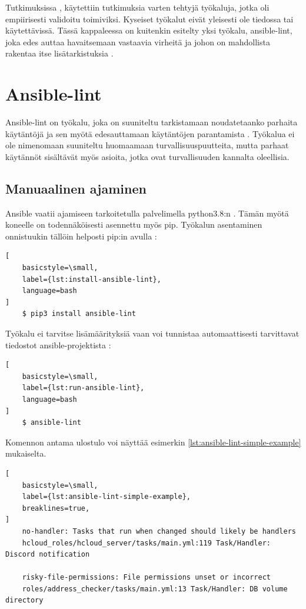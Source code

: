 Tutkimuksissa \parencite{RahmanAkond2019TSSS}, \parencite{RahmanAkond2021SSiA} käytettiin
tutkimuksia varten tehtyjä työkaluja, jotka oli empiirisesti validoitu toimiviksi.
Kyseiset työkalut eivät yleisesti ole tiedossa tai käytettävissä. Tässä kappaleessa on
kuitenkin esitelty yksi työkalu, ansible-lint, joka edes auttaa havaitsemaan vastaavia
virheitä ja johon on mahdollista rakentaa itse lisätarkistuksia \parencite{SestoVincent2020ATaV}.

\section{Ansible-lint}

Ansible-lint on työkalu, joka on suuniteltu tarkistamaan noudatetaanko parhaita
käytäntöjä ja sen myötä edesauttamaan käytäntöjen parantamista \parencite{GithubAnsibleLint}.
Työkalua ei ole nimenomaan suuniteltu huomaamaan turvallisuuspuutteita, mutta parhaat
käytännöt sisältävät myös asioita, jotka ovat turvallisuuden kannalta oleellisia.

\subsection{Manuaalinen ajaminen}

Ansible vaatii ajamiseen tarkoitetulla palvelimella python3.8:n \parencite{AnsibleDocs}.
Tämän myötä koneelle on todennäköisesti asennettu myös pip. Työkalun asentaminen
onnistuukin tällöin helposti pip:in avulla \parencite{AnsibleLintReadTheDocs}:

\begin{lstlisting}[
    basicstyle=\small,
    label={lst:install-ansible-lint},
    language=bash
]
    $ pip3 install ansible-lint
\end{lstlisting}

Työkalu ei tarvitse lisämäärityksiä vaan voi tunnistaa automaattisesti tarvittavat
tiedostot ansible-projektista \parencite{AnsibleLintReadTheDocs}:

\begin{lstlisting}[
    basicstyle=\small,
    label={lst:run-ansible-lint},
    language=bash
]
    $ ansible-lint
\end{lstlisting}

Komennon antama ulostulo voi näyttää esimerkin \ref{lst:ansible-lint-simple-example} mukaiselta.

\begin{lstlisting}[
    basicstyle=\small,
    label={lst:ansible-lint-simple-example},
    breaklines=true,
]
    no-handler: Tasks that run when changed should likely be handlers
    hcloud_roles/hcloud_server/tasks/main.yml:119 Task/Handler: Discord notification

    risky-file-permissions: File permissions unset or incorrect
    roles/address_checker/tasks/main.yml:13 Task/Handler: DB volume directory
\end{lstlisting}

